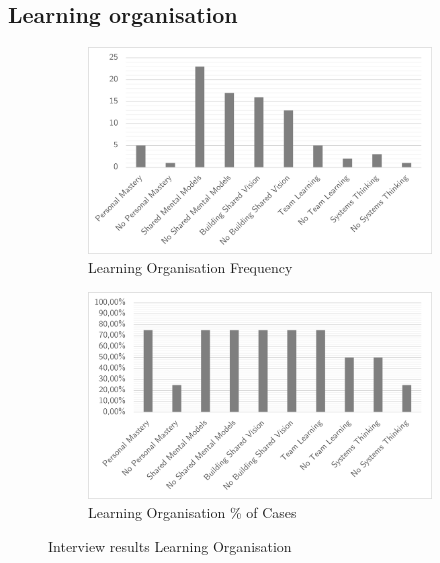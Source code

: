 \subsection{Learning organisation}
\begin{figure}[H]
	\centering
	\begin{subfigure}[H]{0.5\textwidth}
		\centering
		\includegraphics[width=0.95\linewidth]{images/learningorganisation_frequency}
		\caption{Learning Organisation Frequency}
		\label{fig:learningorganisationfrequency}
	\end{subfigure}%
	\begin{subfigure}[H]{0.5\textwidth}
		\centering
		\includegraphics[width=0.95\linewidth]{images/learningorganisation_cases}
		\caption{Learning Organisation \% of Cases}
		\label{fig:learningorganisationcases}
	\end{subfigure}
	\caption{Interview results Learning Organisation}
	\label{fig:learningorganisationsantifragile}
\end{figure}


